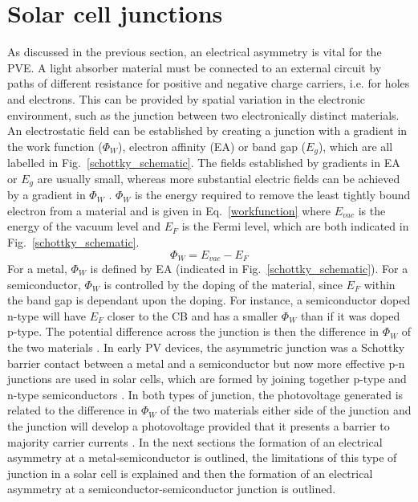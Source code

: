 \documentclass[11pt, twoside]{report}
\begin{document}
\section{Solar cell junctions}\label{junctions}
As discussed in the previous section, an electrical asymmetry is vital for the PVE. A light absorber material must be connected to an external circuit by paths of different resistance for positive and negative charge carriers, i.e. for holes and electrons. This can be provided by spatial variation in the electronic environment, such as the junction between two electronically distinct materials.
An electrostatic field can be established by creating a junction with a gradient in the work function ($\Phi_W$), electron affinity (EA) or band gap ($E_g$), which are all labelled in Fig.~\ref{schottky_schematic}. The fields established by gradients in EA or $E_g$ are usually small, whereas more substantial electric fields can be achieved by a gradient in $\Phi_W$ \cite{Nelson5}.
$\Phi_W$ is the energy required to remove the least tightly bound electron from a material and is given in Eq.~\ref{workfunction} where $E_{vac}$ is the energy of the vacuum level and $E_F$ is the Fermi level, which are both indicated in Fig.~\ref{schottky_schematic}. 
\begin{equation}\label{workfunction}
\Phi_W = E_{vac} - E_F
\end{equation}
For a metal, $\Phi_W$ is defined by EA (indicated in Fig.~\ref{schottky_schematic}). For a semiconductor, $\Phi_W$ is controlled by the doping of the material, since $E_F$ within the band gap is dependant upon the doping. For instance, a semiconductor doped n-type will have $E_F$ closer to the CB and has a smaller $\Phi_W$ than if it was doped p-type. The potential difference across the junction is then the difference in $\Phi_W$ of the two materials \cite{Nelson5}.
In early PV devices, the asymmetric junction was a Schottky barrier contact between a metal and a semiconductor but now more effective p-n junctions are used in solar cells, which are formed by joining together p-type and n-type semiconductors \cite{Nelson1}.
In both types of junction, the photovoltage generated is related to the difference in $\Phi_W$ of the two materials either side of the junction and the junction will develop a photovoltage provided that it presents a barrier to majority carrier currents \cite{Nelson5}. In the next sections the formation of an electrical asymmetry at a metal-semiconductor is outlined, the limitations of this type of junction in a solar cell is explained and then the formation of an electrical asymmetry at a semiconductor-semiconductor junction is outlined.
\end{document}

